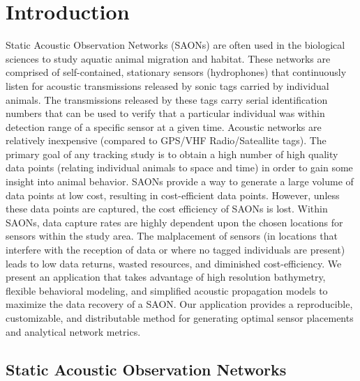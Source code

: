 \chapter{Introduction}
Static Acoustic Observation Networks (SAONs) are often used in the biological sciences to study aquatic animal migration and habitat.  These networks are comprised of self-contained, stationary sensors (hydrophones) that continuously listen for acoustic transmissions released by sonic tags carried by individual animals.  The transmissions released by these tags carry serial identification numbers that can be used to verify that a particular individual was within detection range of a specific sensor at a given time.  Acoustic networks are relatively inexpensive (compared to GPS/VHF Radio/Sateallite tags).  The primary goal of any tracking study is to obtain a high number of high quality data points (relating individual animals to space and time) in order to gain some insight into animal behavior.  SAONs provide a way to generate a large volume of data points at low cost, resulting in cost-efficient data points.  However, unless these data points are captured, the cost efficiency of SAONs is lost.  Within SAONs, data capture rates are highly dependent upon the chosen locations for sensors within the study area.  The malplacement of sensors (in locations that interfere with the reception of data or where no tagged individuals are present) leads to low data returns, wasted resources, and diminished cost-efficiency.  We present an application that takes advantage of high resolution bathymetry, flexible behavioral modeling, and simplified acoustic propagation models to maximize the data recovery of a SAON.  Our application provides a reproducible, customizable, and distributable method for generating optimal sensor placements and analytical network metrics.

\section{Static Acoustic Observation Networks}
